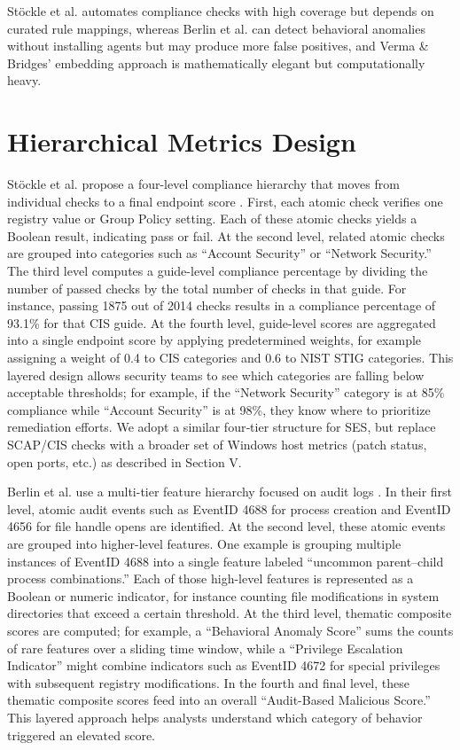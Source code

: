 \documentclass[conference, letterpaper]{IEEEtran}
\begin{document}
    Stöckle et al. automates compliance checks with high coverage but depends on curated rule mappings, whereas Berlin et al. can detect behavioral anomalies without installing agents but may produce more false positives, and Verma \& Bridges' embedding approach is mathematically elegant but computationally heavy.

    \section{Hierarchical Metrics Design}
    Stöckle et al. propose a four-level compliance hierarchy that moves from individual checks to a final endpoint score \cite{b1}. First, each atomic check verifies one registry value or Group Policy setting. Each of these atomic checks yields a Boolean result, indicating pass or fail. At the second level, related atomic checks are grouped into categories such as “Account Security” or “Network Security.” The third level computes a guide-level compliance percentage by dividing the number of passed checks by the total number of checks in that guide. For instance, passing 1875 out of 2014 checks results in a compliance percentage of 93.1\% for that CIS guide. At the fourth level, guide-level scores are aggregated into a single endpoint score by applying predetermined weights, for example assigning a weight of 0.4 to CIS categories and 0.6 to NIST STIG categories. This layered design allows security teams to see which categories are falling below acceptable thresholds; for example, if the “Network Security” category is at 85\% compliance while “Account Security” is at 98\%, they know where to prioritize remediation efforts. We adopt a similar four‐tier structure for SES, but replace SCAP/CIS checks with a broader set of Windows host metrics (patch status, open ports, etc.) as described in Section V.

    Berlin et al. use a multi-tier feature hierarchy focused on audit logs \cite{b2}. In their first level, atomic audit events such as EventID 4688 for process creation and EventID 4656 for file handle opens are identified. At the second level, these atomic events are grouped into higher-level features. One example is grouping multiple instances of EventID 4688 into a single feature labeled “uncommon parent–child process combinations.” Each of those high-level features is represented as a Boolean or numeric indicator, for instance counting file modifications in system directories that exceed a certain threshold. At the third level, thematic composite scores are computed; for example, a “Behavioral Anomaly Score” sums the counts of rare features over a sliding time window, while a “Privilege Escalation Indicator” might combine indicators such as EventID 4672 for special privileges with subsequent registry modifications. In the fourth and final level, these thematic composite scores feed into an overall “Audit-Based Malicious Score.” This layered approach helps analysts understand which category of behavior triggered an elevated score.
\end{document}
